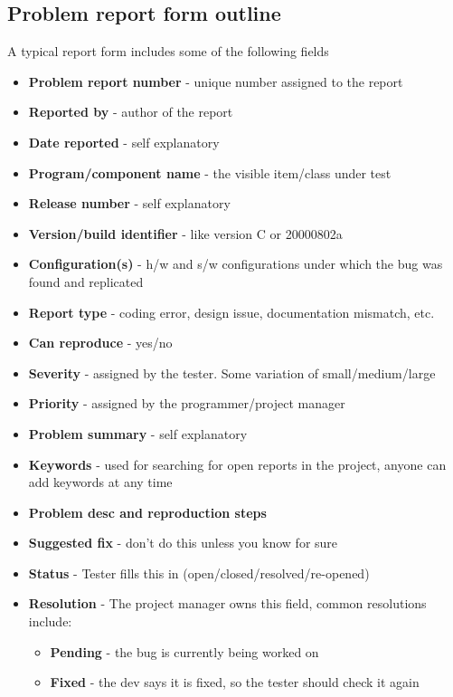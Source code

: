 \documentclass[12pt]{book}
\begin{document}
\subsection*{Problem report form outline}

A typical report form includes some of the following fields

\begin{itemize}
    \item \textbf{Problem report number} - unique number assigned to the report
    \item \textbf{Reported by} - author of the report
    \item \textbf{Date reported} - self explanatory
    \item \textbf{Program/component name} - the visible item/class under test
    \item \textbf{Release number} - self explanatory
    \item \textbf{Version/build identifier} - like version C or 20000802a
    \item \textbf{Configuration(s)} - h/w and s/w configurations under which the bug was found and replicated
    \item \textbf{Report type} - coding error, design issue, documentation mismatch, etc.
    \item \textbf{Can reproduce} - yes/no
    \item \textbf{Severity} - assigned by the tester. Some variation of small/medium/large
    \item \textbf{Priority} - assigned by the programmer/project manager
    \item \textbf{Problem summary} - self explanatory
    \item \textbf{Keywords} - used for searching for open reports in the project, anyone can add keywords at any time
    \item \textbf{Problem desc and reproduction steps}
    \item \textbf{Suggested fix} - don't do this unless you know for sure
    \item \textbf{Status} - Tester fills this in (open/closed/resolved/re-opened)
    \item \textbf{Resolution} - The project manager owns this field, common resolutions include:
    \begin{itemize}
        \item \textbf{Pending} - the bug is currently being worked on
        \item \textbf{Fixed} - the dev says it is fixed, so the tester should check it again

\end{itemize}
\end{itemize}
\end{document}
